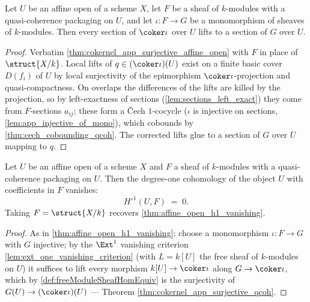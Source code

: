 \begin{theorem}
  \label{thm:cokernel_app_surjective_qcoh}
  \leanok
  Let \(U\) be an affine open of a scheme \(X\), let \(F\) be a sheaf of \(k\)-modules with a
  quasi-coherence packaging on \(U\), and let \(\iota : F \to G\) be a monomorphism of sheaves of
  \(k\)-modules. Then every section of \(\coker \iota\) over \(U\) lifts to a section of \(G\)
  over \(U\).
\end{theorem}
\begin{proof}
  \leanok
  Verbatim \ref{thm:cokernel_app_surjective_affine_open} with \(F\) in place of \(\struct{X/k}\).
  Local lifts of \(q \in (\coker \iota)(U)\) exist on a finite basic cover \(D(f_i)\) of \(U\) by
  local surjectivity of the epimorphism \(\coker\iota\)-projection and quasi-compactness. On
  overlaps the differences of the lifts are killed by the projection, so by left-exactness of
  sections (\ref{lem:sections_left_exact}) they come from \(F\)-sections \(a_{ij}\); these form a
  \v{C}ech \(1\)-cocycle (\(\iota\) is injective on sections, \ref{lem:app_injective_of_mono}),
  which cobounds by \ref{thm:cech_cobounding_qcoh}. The corrected lifts glue to a section of \(G\)
  over \(U\) mapping to \(q\).
\end{proof}

\begin{theorem}
  \label{thm:hModule1_vanishing_qcoh}
  \leanok
  Let \(U\) be an affine open of a scheme \(X\) and \(F\) a sheaf of \(k\)-modules with a
  quasi-coherence packaging on \(U\). Then the degree-one cohomology of the object \(U\) with
  coefficients in \(F\) vanishes:
  \[
    H'^1(U, F) \;=\; 0 .
  \]
  Taking \(F = \struct{X/k}\) recovers \ref{thm:affine_open_h1_vanishing}.
\end{theorem}
\begin{proof}
  \leanok
  As in \ref{thm:affine_open_h1_vanishing}: choose a monomorphism \(\iota : F \to G\) with \(G\)
  injective; by the \(\Ext^1\) vanishing criterion \ref{lem:ext_one_vanishing_criterion} (with
  \(L = k[U]\) the free sheaf of \(k\)-modules on \(U\)) it suffices to lift every morphism
  \(k[U] \to \coker \iota\) along \(G \to \coker \iota\), which by \ref{def:freeModuleSheafHomEquiv}
  is the surjectivity of \(G(U) \to (\coker \iota)(U)\) — Theorem
  \ref{thm:cokernel_app_surjective_qcoh}.
\end{proof}

